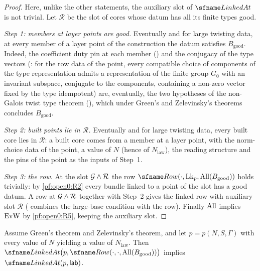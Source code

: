 \begin{proof}
Here, unlike the other statements, the auxiliary slot of $\openzeroLinked$ is not trivial. Let $\mathcal R$ be the slot of
cores whose datum has all its finite types good.

\emph{Step 1: members at layer points are good.} Eventually and for large twisting data, at every member of a layer point
of the construction the datum satisfies $B_{\mathrm{good}}$. Indeed, the coefficient duty pin at each member
() and the conjugacy of the type vectors
(: for the row data of the point, every compatible choice of components of the
type representation admits a representation of the finite group $G_0$ with an invariant subspace, conjugate to the
components, containing a non-zero vector fixed by the type idempotent) are, eventually, the two hypotheses of the
non-Galois twist type theorem (), which under Green's and Zelevinsky's
theorems concludes $B_{\mathrm{good}}$.

\emph{Step 2: built points lie in $\mathcal R$.} Eventually and for large twisting data, every built core lies in $\mathcal
R$: a built core comes from a member at a layer point, with the norm-choice data of the point, a value of $N$ (hence of
$N_{\mathrm{law}}$), the reading structure and the pins of the point as the inputs of Step~1.

\emph{Step 3: the row.} At the slot $\mathcal{G}\wedge\mathcal R$ the row $\openzeroRow(\cdot,\openzeroLk_p,
\openzeroAll(B_{\mathrm{good}}))$ holds trivially: by \ref{pf:open0:R2} every bundle linked to a point of the slot has a good
datum. A row at $\mathcal{G}\wedge\mathcal R$ together with Step~2 gives the linked row with auxiliary slot $\mathcal R$
( combines the large-base condition with the row). Finally
$\mathrm{All}$ implies $\mathrm{EvW}$ by \ref{pf:open0:R5}, keeping the auxiliary slot.
\end{proof}

\begin{proposition}[Labels]\label{pf:open0:lab}
Assume Green's theorem and Zelevinsky's theorem, and let $p=p(N,S,\Gamma)$ with every value of $N$ yielding a value of
$N_{\mathrm{law}}$. Then $\openzeroLinked\bigl(p,\openzeroRow(\cdot,\cdot,\openzeroAll(B_{\mathrm{good}}))\bigr)$ implies
$\openzeroLinked(p,\mathsf{lab})$.
\ \
\ \
\ 
\end{proposition}

